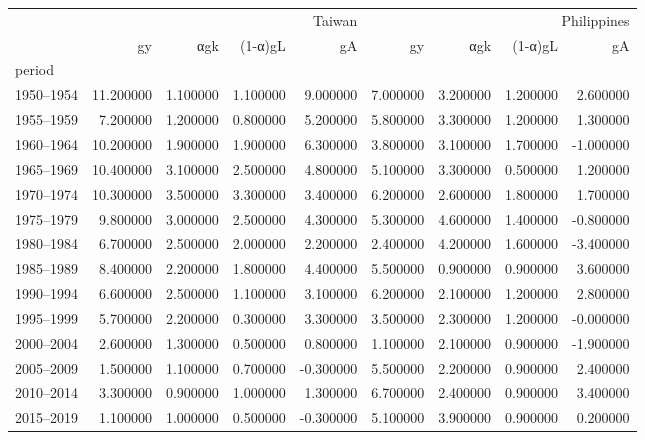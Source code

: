 \begin{tabular}{lrrrrrrrr}
\toprule
 & \multicolumn{4}{r}{Taiwan} & \multicolumn{4}{r}{Philippines} \\
 & gy & αgk & (1-α)gL & gA & gy & αgk & (1-α)gL & gA \\
period &  &  &  &  &  &  &  &  \\
\midrule
1950–1954 & 11.200000 & 1.100000 & 1.100000 & 9.000000 & 7.000000 & 3.200000 & 1.200000 & 2.600000 \\
1955–1959 & 7.200000 & 1.200000 & 0.800000 & 5.200000 & 5.800000 & 3.300000 & 1.200000 & 1.300000 \\
1960–1964 & 10.200000 & 1.900000 & 1.900000 & 6.300000 & 3.800000 & 3.100000 & 1.700000 & -1.000000 \\
1965–1969 & 10.400000 & 3.100000 & 2.500000 & 4.800000 & 5.100000 & 3.300000 & 0.500000 & 1.200000 \\
1970–1974 & 10.300000 & 3.500000 & 3.300000 & 3.400000 & 6.200000 & 2.600000 & 1.800000 & 1.700000 \\
1975–1979 & 9.800000 & 3.000000 & 2.500000 & 4.300000 & 5.300000 & 4.600000 & 1.400000 & -0.800000 \\
1980–1984 & 6.700000 & 2.500000 & 2.000000 & 2.200000 & 2.400000 & 4.200000 & 1.600000 & -3.400000 \\
1985–1989 & 8.400000 & 2.200000 & 1.800000 & 4.400000 & 5.500000 & 0.900000 & 0.900000 & 3.600000 \\
1990–1994 & 6.600000 & 2.500000 & 1.100000 & 3.100000 & 6.200000 & 2.100000 & 1.200000 & 2.800000 \\
1995–1999 & 5.700000 & 2.200000 & 0.300000 & 3.300000 & 3.500000 & 2.300000 & 1.200000 & -0.000000 \\
2000–2004 & 2.600000 & 1.300000 & 0.500000 & 0.800000 & 1.100000 & 2.100000 & 0.900000 & -1.900000 \\
2005–2009 & 1.500000 & 1.100000 & 0.700000 & -0.300000 & 5.500000 & 2.200000 & 0.900000 & 2.400000 \\
2010–2014 & 3.300000 & 0.900000 & 1.000000 & 1.300000 & 6.700000 & 2.400000 & 0.900000 & 3.400000 \\
2015–2019 & 1.100000 & 1.000000 & 0.500000 & -0.300000 & 5.100000 & 3.900000 & 0.900000 & 0.200000 \\
\bottomrule
\end{tabular}
